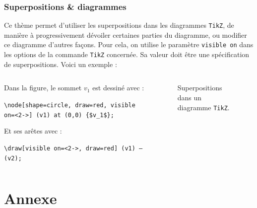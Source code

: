 \documentclass[10pt,    %
    french,             %
    xcolor=table,       %
    envcountsect        %
]{beamer}
\begin{document}
\begin{frame}
    \frametitle{Superpositions \& diagrammes}
    Ce thème permet d'utiliser les superpositions dans les diagrammes \texttt{TikZ}, de manière à progressivement dévoiler certaines parties du diagramme, ou modifier ce diagramme d'autres façons. Pour cela, on utilise le paramètre \texttt{visible on} dans les options de la commande \texttt{TikZ} concernée. Sa valeur doit être une spécification de superpositions. Voici un exemple :
    
    \begin{columns}[totalwidth=\textwidth]
        \begin{column}{0.49\textwidth}
            Dans la figure, le sommet $v_1$ est dessiné avec :

            \texttt{\textbackslash{}node[shape=circle, draw=red, \alert{visible on=<2->}] (v1) at (0,0) \{\$v\_1\$\};}
            
            \vspace{0.25cm}
            Et ses arêtes avec :
	        
	        \texttt{\textbackslash{}draw[\alert{visible on=<2->}, draw=red] (v1) -- (v2);}
        \end{column}
        \begin{column}{0.49\textwidth}
            \begin{figure}[H]
                \centering
                \resizebox{0.6\linewidth}{!}{}
                \caption{Superpositions dans un diagramme \texttt{TikZ}.}
                \label{fig:overlays}
            \end{figure}
        \end{column}
    \end{columns}
\end{frame}












\appendix
\section{Annexe}
\sectionframe
\end{document}
